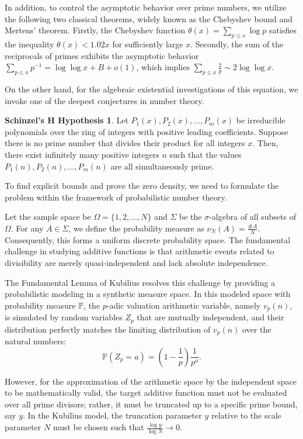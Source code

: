 \documentclass[12pt, a4paper]{article}
\theoremstyle{plain}
\theoremstyle{definition}
\newtheorem*{hypothesis}{Schinzel's H Hypothesis}
\begin{document}
In addition, to control the asymptotic behavior over prime numbers, we utilize the following two classical theorems, widely known as the Chebyshev bound and Mertens' theorem.
Firstly, the Chebyshev function $\theta(x) = \sum_{p \leq x} \log p$ satisfies the inequality $\theta(x) < 1.02x$ for sufficiently large $x$. Secondly, the sum of the reciprocals of primes exhibits the asymptotic behavior $\sum_{p \leq x} p^{-1} = \log \log x + B + o(1)$, which implies $\sum_{p \leq x} \frac{2}{p} \sim 2 \log \log x$.

On the other hand, for the algebraic existential investigations of this equation, we invoke one of the deepest conjectures in number theory.

\begin{hypothesis}
Let $P_1(x), P_2(x), \dots, P_m(x)$ be irreducible polynomials over the ring of integers with positive leading coefficients. Suppose there is no prime number that divides their product for all integers $x$. Then, there exist infinitely many positive integers $n$ such that the values $P_1(n), P_2(n), \dots, P_m(n)$ are all simultaneously prime.
\end{hypothesis}

To find explicit bounds and prove the zero density, we need to formulate the problem within the framework of probabilistic number theory.

Let the sample space be $\Omega = \{1, 2, \dots, N\}$ and $\Sigma$ be the $\sigma$-algebra of all subsets of $\Omega$. For any $A \in \Sigma$, we define the probability measure as $\nu_N(A) = \frac{\text{\#}A}{N}$. Consequently, this forms a uniform discrete probability space. The fundamental challenge in studying additive functions is that arithmetic events related to divisibility are merely quasi-independent and lack absolute independence.

The Fundamental Lemma of Kubilius resolves this challenge by providing a probabilistic modeling in a synthetic measure space. In this modeled space with probability measure $\mathbb{P}$, the $p$-adic valuation arithmetic variable, namely $v_p(n)$, is simulated by random variables $Z_p$ that are mutually independent, and their distribution perfectly matches the limiting distribution of $v_p(n)$ over the natural numbers:
\[ \mathbb{P}(Z_p = a) = \left(1 - \frac{1}{p}\right) \frac{1}{p^a}. \]

However, for the approximation of the arithmetic space by the independent space to be mathematically valid, the target additive function must not be evaluated over all prime divisors; rather, it must be truncated up to a specific prime bound, say $y$. In the Kubilius model, the truncation parameter $y$ relative to the scale parameter $N$ must be chosen such that $\frac{\log y}{\log N} \to 0$.
\end{document}
